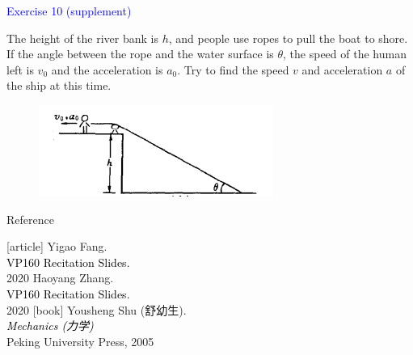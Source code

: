 \documentclass{beamer}
\begin{document}
\begin{frame}
\textcolor{blue}{Exercise 10 (supplement)}

The height of the river bank is $h$, and people use ropes to pull the boat to shore. If the angle between the rope and the water surface is $\theta$, the speed of the human left is $v_0$ and the acceleration is $a_0$. Try to find the speed $v$ and acceleration $a$ of the ship at this time.
\begin{figure}[htbp]
\centering
\includegraphics[width=0.5 \linewidth, angle =0]{ex10.png}
\label{fig:5}
\end{figure}
\end{frame}

\begin{frame}{Reference}
  \begin{thebibliography}{9}
  [article]
   Yigao Fang.\\
  \textcolor{black}{VP160 Recitation Slides.}\\
  2020
   Haoyang Zhang.\\
  \textcolor{black}{VP160 Recitation Slides.}\\
  2020
  [book]
   Yousheng Shu (舒幼生).\\
  \textcolor{black}{\textit{Mechanics (力学)}}\\
  Peking University Press, 2005
  \end{thebibliography}
  \end{frame}

  
\end{document}
